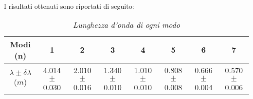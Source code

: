 \documentclass[12pt, a4paper]{article}
\begin{document}
 I risultati ottenuti sono riportati di seguito: 
 
 {
\renewcommand\arraystretch{1.2} %

\begin{table}[ht] %


\begin{tabular}{|c|c|c|c|c|c|c|c|} 
 
 \hline
  Modi (n) & 1 & 2 & 3 & 4 & 5 & 6 & 7\\
  
\hline

  
  $\lambda\pm\delta\lambda$ ($m$) &\footnotesize{4.014$\pm$0.030}  &\footnotesize{2.010$\pm$0.016} &\footnotesize{1.340$\pm$0.010}&\footnotesize{1.010$\pm$0.010}&\footnotesize{0.808$\pm$0.008} &\footnotesize{0.666$\pm$0.004}&\footnotesize{0.570$\pm$0.006}\\
\hline


\end{tabular}\\
\caption{\small{\textit{Lunghezza d'onda di ogni modo} }}
    \label{tab:Lunghezza_d'onda}
\end{table}
}





\newpage
\end{document}
